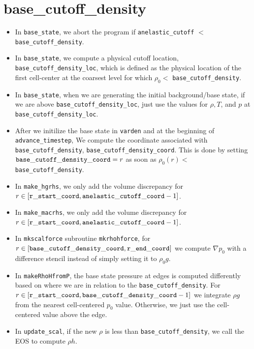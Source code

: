 \documentclass[11pt]{article}
\begin{document}
\section{base\_cutoff\_density}
\begin{itemize}
\item In {\tt base\_state}, we abort the program if {\tt anelastic\_cutoff} $<$ {\tt base\_cutoff\_density}.
\item In {\tt base\_state}, we compute a physical cutoff location, {\tt base\_cutoff\_density\_loc}, which is defined as the physical location of the first cell-center at the coarsest level for which $\rho_0 <$ {\tt base\_cutoff\_density}.
\item In {\tt base\_state}, when we are generating the initial background/base state, if we are above {\tt base\_cutoff\_density\_loc}, just use the values for $\rho,T$, and $p$ at {\tt base\_cutoff\_density\_loc}.
\item After we initilize the base state in {\tt varden} and at the beginning of {\tt advance\_timestep}, We compute the coordinate associated with {\tt base\_cutoff\_density}, {\tt base\_cutoff\_density\_coord}.  This is done by setting ${\tt base\_cutoff\_density\_coord}= r$ as soon as $\rho_0(r) <$ {\tt base\_cutoff\_density}.
\item In {\tt make\_hgrhs}, we only add the volume discrepancy for $r\in[{\tt r\_start\_coord},{\tt anelastic\_cutoff\_coord}-1]$.
\item In {\tt make\_macrhs}, we only add the volume discrepancy for $r\in[{\tt r\_start\_coord},{\tt anelastic\_cutoff\_coord}-1]$.
\item In {\tt mkscalforce} subroutine {\tt mkrhohforce}, for $r\in[{\tt base\_cutoff\_density\_coord},{\tt r\_end\_coord}]$ we compute $\nabla p_0$ with a difference stencil instead of simply setting it to $\rho_0 g$.
\item In {\tt makeRhoHfromP}, the base state pressure at edges is computed differently based on where we are in relation to the {\tt base\_cutoff\_density}.  For $r\in[{\tt r\_start\_coord},{\tt base\_cutoff\_density\_coord}-1]$ we integrate $\rho g$ from the nearest cell-centered $p_0$ value.  Otherwise, we just use the cell-centered value above the edge.
\item In {\tt update\_scal}, if the new $\rho$ is less than {\tt base\_cutoff\_density}, we call the EOS to compute $\rho h$.
\end{itemize}
\end{document}
